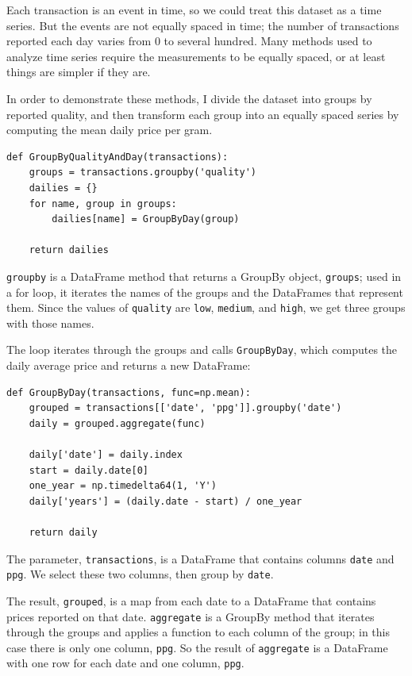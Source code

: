 \documentclass[12pt]{book}
\begin{document}
Each transaction is an event in time, so we could treat this dataset
as a time series.  But the events are not equally spaced in time; the
number of transactions reported each day varies from 0 to several
hundred.  Many methods used to analyze time series require the
measurements to be equally spaced, or at least things are simpler if
they are.

In order to demonstrate these methods, I divide the dataset
into groups by reported quality, and then transform each group into
an equally spaced series by computing the mean daily price per gram.

\begin{verbatim}
def GroupByQualityAndDay(transactions):
    groups = transactions.groupby('quality')
    dailies = {}
    for name, group in groups:
        dailies[name] = GroupByDay(group)        

    return dailies
\end{verbatim}

\verb"groupby" is a DataFrame method that returns a GroupBy object,
\verb"groups"; used in a for loop, it iterates the names of the groups
and the DataFrames that represent them.  Since the values of \verb"quality" are
\verb"low", \verb"medium", and \verb"high", we get three
groups with those names.   

The loop iterates through the groups and calls \verb"GroupByDay",
which computes the daily average price and returns a new DataFrame:

\begin{verbatim}
def GroupByDay(transactions, func=np.mean):
    grouped = transactions[['date', 'ppg']].groupby('date')
    daily = grouped.aggregate(func)

    daily['date'] = daily.index
    start = daily.date[0]
    one_year = np.timedelta64(1, 'Y')
    daily['years'] = (daily.date - start) / one_year

    return daily
\end{verbatim}

The parameter, \verb"transactions", is a DataFrame that contains
columns \verb"date" and \verb"ppg".  We select these two
columns, then group by \verb"date".

The result, \verb"grouped", is a map from each date to a DataFrame that
contains prices reported on that date.  \verb"aggregate" is a
GroupBy method that iterates through the groups and applies a
function to each column of the group; in this case there is only one
column, \verb"ppg".  So the result of \verb"aggregate" is a DataFrame
with one row for each date and one column, \verb"ppg".
\end{document}
